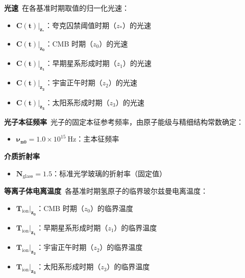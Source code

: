\documentclass[12pt,leqno]{article}
\begin{document}
	\medskip
	\noindent
	
	{\bf 光速}\,\,\,在各基准时期取值的归一化光速：
	\begin{itemize}
		\item $\left.\boldsymbol{C(t)}\right|_{\boldsymbol{z_{*}}}$：夸克囚禁阈值时期（$z_{*}$）的光速
		\item $\left.\boldsymbol{C(t)}\right|_{\boldsymbol{z_0}}$：CMB 时期（$z_0$）的光速
		\item $\left.\boldsymbol{C(t)}\right|_{\boldsymbol{z_1}}$：早期星系形成时期（$z_1$）的光速
		\item $\left.\boldsymbol{C(t)}\right|_{\boldsymbol{z_2}}$：宇宙正午时期（$z_2$）的光速
		\item $\left.\boldsymbol{C(t)}\right|_{\boldsymbol{z_3}}$：太阳系形成时期（$z_3$）的光速
	\end{itemize}
	
	\medskip
	\noindent
	
	{\bf 光子本征频率}\,\,\,光子的固定本征参考频率，由原子能级与精细结构常数确定：
	\begin{itemize}
		\item $\boldsymbol{\nu_{n0}}=1.0\times10^{15}\ \text{Hz}$：主本征频率
	\end{itemize}
	
	\medskip
	\noindent
	
	{\bf 介质折射率}\,\,\,
	\begin{itemize}
		\item $\boldsymbol{N}_{\text{glass}}=1.5$：标准光学玻璃的折射率（固定值）
	\end{itemize}
	
	\medskip
	\noindent
	
	{\bf 等离子体电离温度}\,\,\,各基准时期氢原子的临界玻尔兹曼电离温度：
	\begin{itemize}
		\item $\left.\boldsymbol{T_\mathrm{ion}}\right|_{\boldsymbol{z_0}}$：CMB 时期（${z_0}$）的临界温度
		\item $\left.\boldsymbol{T_\mathrm{ion}}\right|_{\boldsymbol{z_1}}$：早期星系形成时期（${z_1}$）的临界温度
		\item $\left.\boldsymbol{T_\mathrm{ion}}\right|_{\boldsymbol{z_2}}$：宇宙正午时期（${z_2}$）的临界温度
		\item $\left.\boldsymbol{T_\mathrm{ion}}\right|_{\boldsymbol{z_3}}$：太阳系形成时期（${z_3}$）的临界温度
	\end{itemize}
	
	\medskip
	\noindent
	
\end{document}
